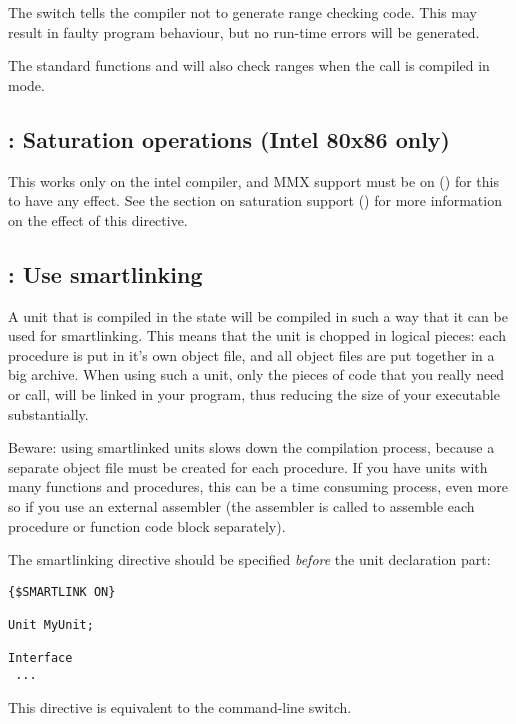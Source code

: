 The  switch tells the compiler not to generate range checking
code. This may result in faulty program behaviour, but no run-time errors
will be generated.

\begin{remark}The standard functions  and  will also check ranges
when the call is compiled in  mode.
\end{remark}

\subsection{ : Saturation operations (Intel 80x86 only)}

This works only on the intel compiler, and MMX support must be on
() for this to have any effect. See the section on
saturation support () for more information
on the effect of this directive.

\subsection{ : Use smartlinking}

A unit that is compiled in the  state will be
compiled in such a way that it can be used for smartlinking. This means that
the unit is chopped in logical pieces: each procedure is put in it's own
object file, and all object files are put together in a big archive. When
using such a unit, only the pieces of code that you really need or call,
will be linked in your program, thus reducing the size of your executable
substantially.

Beware: using smartlinked units slows down the compilation process, because
a separate object file must be created for each procedure. If you have units
with many functions and procedures, this can be a time consuming process,
even more so if you use an external assembler (the assembler is called to
assemble each procedure or function code block separately).

The smartlinking directive should be specified {\em before} the unit
declaration part:
\begin{verbatim}
{$SMARTLINK ON}

Unit MyUnit;

Interface
 ...
\end{verbatim}

This directive is equivalent to the  command-line switch.

